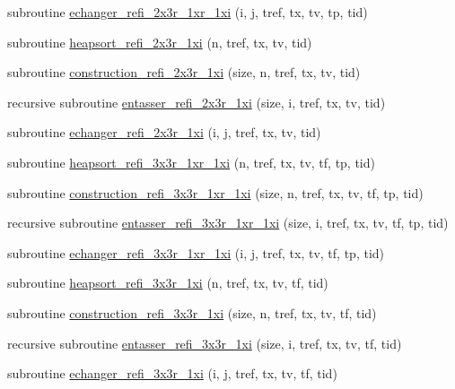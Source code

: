 \begin{DoxyCompactItemize}
\item 
subroutine \hyperlink{namespacemodsortinterf_af56b411a674e066df5be4a24ef336be3}{echanger\+\_\+refi\+\_\+2x3r\+\_\+1xr\+\_\+1xi} (i, j, tref, tx, tv, tp, tid)
\item 
subroutine \hyperlink{namespacemodsortinterf_ac2dc7168d6a963411656a8c43dfc6cd8}{heapsort\+\_\+refi\+\_\+2x3r\+\_\+1xi} (n, tref, tx, tv, tid)
\item 
subroutine \hyperlink{namespacemodsortinterf_add759648e814227c7eaab60be1136bfd}{construction\+\_\+refi\+\_\+2x3r\+\_\+1xi} (size, n, tref, tx, tv, tid)
\item 
recursive subroutine \hyperlink{namespacemodsortinterf_aaa736057b949fa0ab7caf3a9f2939e3c}{entasser\+\_\+refi\+\_\+2x3r\+\_\+1xi} (size, i, tref, tx, tv, tid)
\item 
subroutine \hyperlink{namespacemodsortinterf_a2f6d8ec8dae8388f6359afd4e270cec7}{echanger\+\_\+refi\+\_\+2x3r\+\_\+1xi} (i, j, tref, tx, tv, tid)
\item 
subroutine \hyperlink{namespacemodsortinterf_a8cf65af17497fd22fe3d47f5d7d23094}{heapsort\+\_\+refi\+\_\+3x3r\+\_\+1xr\+\_\+1xi} (n, tref, tx, tv, tf, tp, tid)
\item 
subroutine \hyperlink{namespacemodsortinterf_a3130a7808f6f62b868b3afced894269b}{construction\+\_\+refi\+\_\+3x3r\+\_\+1xr\+\_\+1xi} (size, n, tref, tx, tv, tf, tp, tid)
\item 
recursive subroutine \hyperlink{namespacemodsortinterf_a81c24af2921a4ced0ef5df8a45652e14}{entasser\+\_\+refi\+\_\+3x3r\+\_\+1xr\+\_\+1xi} (size, i, tref, tx, tv, tf, tp, tid)
\item 
subroutine \hyperlink{namespacemodsortinterf_aab7bd2f1fab343a2a5da2652052035a2}{echanger\+\_\+refi\+\_\+3x3r\+\_\+1xr\+\_\+1xi} (i, j, tref, tx, tv, tf, tp, tid)
\item 
subroutine \hyperlink{namespacemodsortinterf_a202fac9db69240603932abfc99728f45}{heapsort\+\_\+refi\+\_\+3x3r\+\_\+1xi} (n, tref, tx, tv, tf, tid)
\item 
subroutine \hyperlink{namespacemodsortinterf_a8a1da2bee36039921d07d76d50821fe5}{construction\+\_\+refi\+\_\+3x3r\+\_\+1xi} (size, n, tref, tx, tv, tf, tid)
\item 
recursive subroutine \hyperlink{namespacemodsortinterf_aab48af578f5c010d365e32ceb20016e0}{entasser\+\_\+refi\+\_\+3x3r\+\_\+1xi} (size, i, tref, tx, tv, tf, tid)
\item 
subroutine \hyperlink{namespacemodsortinterf_a1a9f478c81adb385c800d2db67b4db17}{echanger\+\_\+refi\+\_\+3x3r\+\_\+1xi} (i, j, tref, tx, tv, tf, tid)

\end{DoxyCompactItemize}
